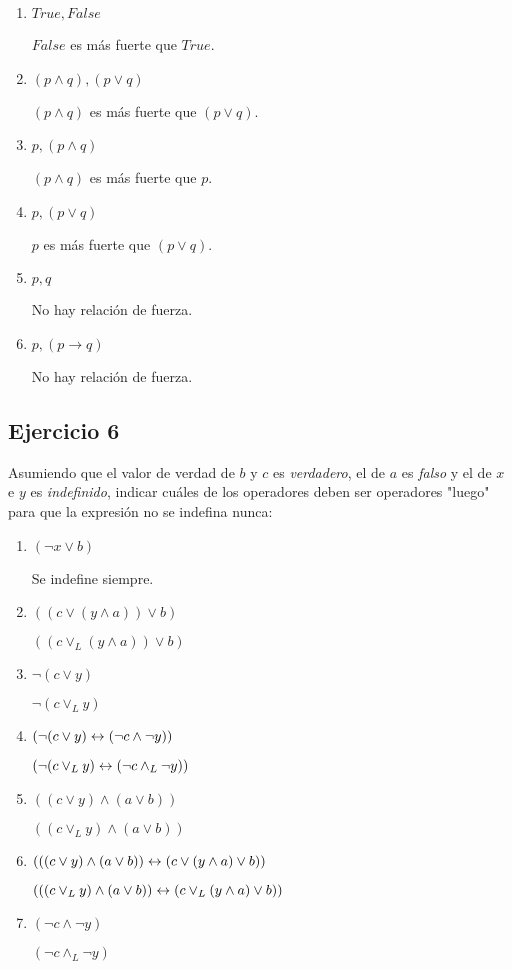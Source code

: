\begin{enumerate}[label=\alph*)]
    \item $True, False$

          $False$ es más fuerte que $True$.

    \item $(p \land q), (p \lor q)$

          $(p \land q)$ es más fuerte que $(p \lor q)$.

    \item $p, (p \land q)$

          $(p \land q)$ es más fuerte que $p$.

    \item $p, (p \lor q)$

          $p$ es más fuerte que $(p \lor q)$.

    \item $p, q$

          No hay relación de fuerza.

    \item $p, (p \to q)$

          No hay relación de fuerza.
\end{enumerate}

\subsection{Ejercicio 6}
Asumiendo que el valor de verdad de $b$ y $c$ es \textit{verdadero}, el de $a$ es \textit{falso} y el de $x$ e $y$ es \textit{indefinido}, indicar cuáles de los operadores deben ser operadores "luego" para que la expresión no se indefina nunca:

\begin{enumerate}[label=\alph*)]
    \item $(\neg x \lor b)$

          Se indefine siempre.

    \item $((c \lor (y \land a)) \lor b)$

          $((c \lor_L (y \land a)) \lor b)$

    \item $\neg (c \lor y)$

          $\neg (c \lor_L y)$

    \item $(\neg (c \lor y) \leftrightarrow (\neg c \land \neg y))$

          $(\neg (c \lor_L y) \leftrightarrow (\neg c \land_L \neg y))$

    \item $((c \lor y) \land (a \lor b))$

          $((c \lor_L y) \land (a \lor b))$

    \item $(((c \lor y) \land (a \lor b)) \leftrightarrow (c \lor (y \land a) \lor b))$

          $(((c \lor_L y) \land (a \lor b)) \leftrightarrow (c \lor_L (y \land a) \lor b))$

    \item $(\neg c \land \neg y)$

          $(\neg c \land_L \neg y)$
\end{enumerate}

